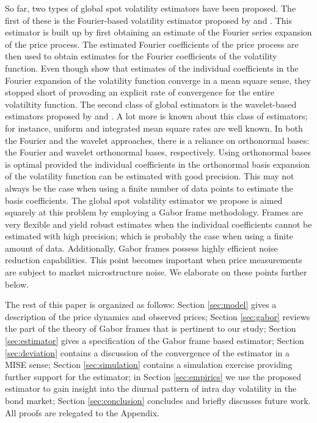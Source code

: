 So far, two types of global spot volatility estimators have been proposed. The first of these is  the Fourier-based volatility estimator proposed by  \cite{Malliavin2002} and \cite{Malliavin2009}. This estimator is built up  by first obtaining an estimate of  the Fourier series expansion  of the price process. The estimated Fourier coefficients of the price process are then used to obtain estimates for the Fourier coefficients of the volatility function.  Even though \citeauthor{Malliavin2002} show that estimates of the individual coefficients  in the Fourier expansion of the volatility function converge in a mean square sense, they stopped short of provoding an explicit rate of convergence for the entire volatiltity function. The second class of global estimators is the wavelet-based estimators proposed by     \cite{GenonCatalot1992} and \cite{Hoffmann2012}. A lot more is known about this class of estimators; for instance, uniform and integrated mean square rates are well known.  In both the Fourier and the wavelet approaches, there is a reliance  on orthonormal bases: the Fourier and wavelet orthonormal bases, respectively.  Using orthonormal bases  is optimal  provided the  individual coefficients in the orthonormal basis expansion of the volatility function can be estimated with good precision. This may not always be the case when using a finite number of data points to estimate the basis coefficients. The global spot volatility estimator we propose  is aimed squarely at this problem by employing a Gabor frame methodology. Frames are very flexible and yield robust estimates  when the individual coefficients cannot be estimated with high precision; which is probably the case when using a finite amount of  data. Additionally, Gabor frames  possess highly efficient noise reduction capabilities. This point becomes important when price measurements are subject to market microstructure noise. We elaborate on these points further below.

The rest of this paper is organized as follows: Section \ref{sec:model} gives a description of the price dynamics and observed prices; Section \ref{sec:gabor} reviews the part of the theory of Gabor frames that is pertinent to our study; Section \ref{sec:estimator} gives a specification of the Gabor frame based estimator; Section \ref{sec:deviation} contains a discussion of the convergence of the estimator in a MISE sense; Section \ref{sec:simulation} contains a simulation exercise providing further support for the estimator; in Section \ref{sec:empirics} we use the proposed estimator to gain insight into  the diurnal pattern of intra day volatility in the bond  market;  Section \ref{sec:conclusion} concludes and briefly discusses future work. All proofs are relegated to the Appendix.
